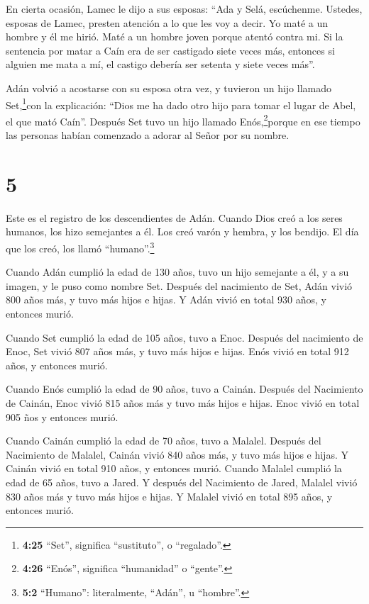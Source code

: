  En cierta ocasión, Lamec le dijo a sus esposas: ``Ada y
Selá, escúchenme. Ustedes, esposas de Lamec, presten atención a lo que
les voy a decir. Yo maté a un hombre y él me hirió. Maté a un hombre
joven porque atentó contra mi.  Si la sentencia por matar a
Caín era de ser castigado siete veces más, entonces si alguien me mata a
mí, el castigo debería ser setenta y siete veces más''.

 Adán volvió a acostarse con su esposa otra vez, y tuvieron
un hijo llamado Set,\footnote{\textbf{4:25} ``Set'', significa
  ``sustituto'', o ``regalado''.}con la explicación: ``Dios me ha dado
otro hijo para tomar el lugar de Abel, el que mató Caín''. 
Después Set tuvo un hijo llamado Enós,\footnote{\textbf{4:26} ``Enós'',
  significa ``humanidad'' o ``gente''.}porque en ese tiempo las personas
habían comenzado a adorar al Señor por su nombre.

\hypertarget{section-4}{%
\section{5}\label{section-4}}

 Este es el registro de los descendientes de Adán. Cuando
Dios creó a los seres humanos, los hizo semejantes a él. 
Los creó varón y hembra, y los bendijo. El día que los creó, los llamó
``humano''.\footnote{\textbf{5:2} ``Humano'': literalmente, ``Adán'', u
  ``hombre''.}

 Cuando Adán cumplió la edad de 130 años, tuvo un hijo
semejante a él, y a su imagen, y le puso como nombre Set. 
Después del nacimiento de Set, Adán vivió 800 años más, y tuvo más hijos
e hijas.  Y Adán vivió en total 930 años, y entonces murió.

 Cuando Set cumplió la edad de 105 años, tuvo a Enoc.
 Después del nacimiento de Enoc, Set vivió 807 años más, y
tuvo más hijos e hijas.  Enós vivió en total 912 años, y
entonces murió.

 Cuando Enós cumplió la edad de 90 años, tuvo a Cainán.
 Después del Nacimiento de Cainán, Enoc vivió 815 años más
y tuvo más hijos e hijas.  Enoc vivió en total 905 ños y
entonces murió.

 Cuando Cainán cumplió la edad de 70 años, tuvo a Malalel.
 Después del Nacimiento de Malalel, Cainán vivió 840 años
más, y tuvo más hijos e hijas.  Y Cainán vivió en total 910
años, y entonces murió.  Cuando Malalel cumplió la edad de
65 años, tuvo a Jared.  Y después del Nacimiento de Jared,
Malalel vivió 830 años más y tuvo más hijos e hijas.  Y
Malalel vivió en total 895 años, y entonces murió.

